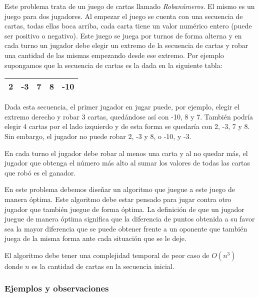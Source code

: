 Este problema trata de un juego de cartas llamado \emph{Robanúmeros}. El mismo es un juego para dos jugadores. Al empezar el juego se cuenta con una secuencia de cartas, todas ellas boca arriba, cada carta tiene un valor numérico entero (puede ser positivo o negativo). Este juego se juega por turnos de forma alterna y en cada turno un jugador debe elegir un extremo de la secuencia de cartas y robar una cantidad de las mismas empezando desde ese extremo. Por ejemplo supongamos que la secuencia de cartas es la dada en la siguiente tabla:

\begin{tabular}{|c|c|c|c|c|}
\hline
2 & -3 & 7 & 8 & -10 \\
\hline
\end{tabular}

Dada esta secuencia, el primer jugador en jugar puede, por ejemplo, elegir el extremo derecho y robar 3 cartas, quedándose así con -10, 8 y 7. También podría elegir 4 cartas por el lado izquierdo y de esta forma se quedaría con 2, -3, 7 y 8. Sin embargo, el jugador no puede robar 2, -3 y 8, o -10, y -3.

En cada turno el jugador debe robar al menos una carta y al no quedar más, el jugador que obtenga el número más alto al sumar los valores de todas las cartas que robó es el ganador.

En este problema debemos diseñar un algoritmo que juegue a este juego de manera óptima. Este algoritmo debe estar pensado para jugar contra otro jugador que también juegue de forma óptima. La definición de que un jugador juegue de manera óptima significa que la diferencia de puntos obtenida a su favor sea la mayor diferencia que se puede obtener frente a un oponente que también juega de la misma forma ante cada situación que se le deje.

El algoritmo debe tener una complejidad temporal de peor caso de $O(n^3)$ donde $n$ es la cantidad de cartas en la secuencia inicial.

\subsubsection{Ejemplos y observaciones}


